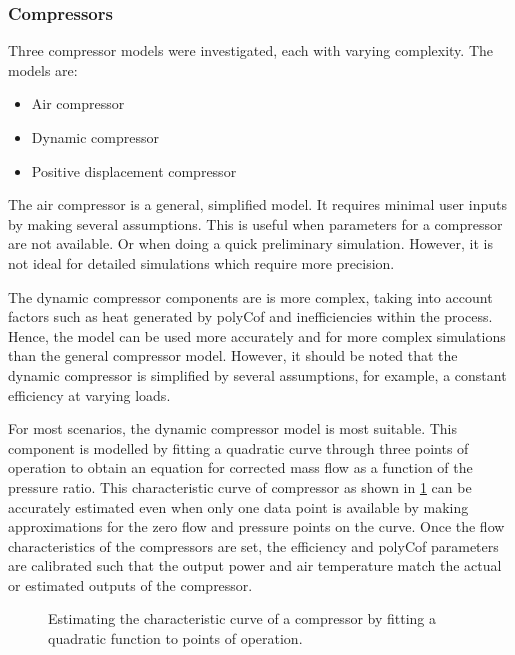 		\subsubsection{Compressors}
		Three compressor models were investigated, each with varying complexity. The models are:
		\begin{itemize}
			\item Air compressor
			\item Dynamic compressor 
			\item Positive displacement compressor
		\end{itemize}  
		The air compressor is a general, simplified model. It requires minimal user inputs by making several assumptions. This is useful when parameters for a compressor are not available. Or when doing a quick preliminary simulation. However, it is not ideal for detailed simulations which require more precision. 
		\par 
		The dynamic compressor components are is more complex, taking into account factors such as heat generated by \gls{polyCof} and inefficiencies within the process. Hence, the model can be used more accurately and for more complex simulations than the general compressor model. However, it should be noted that the dynamic compressor is simplified by several assumptions, for example, a constant efficiency at varying loads. 
		\par 	 
		For most scenarios, the dynamic compressor model is most suitable. This component is modelled by fitting a quadratic curve through three points of operation to obtain an equation for corrected mass flow as a function of the pressure ratio. This characteristic curve of compressor  as shown in \cref{fig: Compressor Curve} can be accurately estimated even when only one data point is available by making approximations for the zero flow and pressure points on the curve. Once the flow characteristics of the compressors are set, the efficiency and \gls{polyCof} parameters are calibrated such that the output power and air temperature match the actual or estimated outputs of the compressor.
		
		\begin{figure}[h]
			\centering
			\fbox{}
			\caption{Estimating the characteristic curve of a compressor by fitting a quadratic function to points of operation.}
			\label{fig: Compressor Curve}
		\end{figure}

